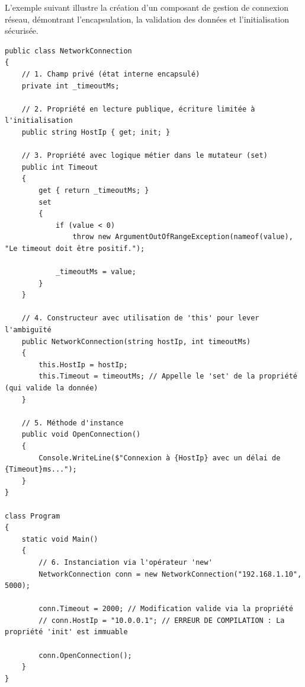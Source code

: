L'exemple suivant illustre la création d'un composant de gestion de connexion réseau, démontrant l'encapsulation, la validation des données et l'initialisation sécurisée.

\begin{lstlisting}[caption={Implémentation d'un composant de connexion réseau}]
public class NetworkConnection
{
    // 1. Champ privé (état interne encapsulé)
    private int _timeoutMs;

    // 2. Propriété en lecture publique, écriture limitée à l'initialisation
    public string HostIp { get; init; }

    // 3. Propriété avec logique métier dans le mutateur (set)
    public int Timeout
    {
        get { return _timeoutMs; }
        set 
        { 
            if (value < 0)
                throw new ArgumentOutOfRangeException(nameof(value), "Le timeout doit être positif.");
            
            _timeoutMs = value;
        }
    }

    // 4. Constructeur avec utilisation de 'this' pour lever l'ambiguïté
    public NetworkConnection(string hostIp, int timeoutMs)
    {
        this.HostIp = hostIp;
        this.Timeout = timeoutMs; // Appelle le 'set' de la propriété (qui valide la donnée)
    }

    // 5. Méthode d'instance
    public void OpenConnection()
    {
        Console.WriteLine($"Connexion à {HostIp} avec un délai de {Timeout}ms...");
    }
}

class Program
{
    static void Main()
    {
        // 6. Instanciation via l'opérateur 'new'
        NetworkConnection conn = new NetworkConnection("192.168.1.10", 5000);
        
        conn.Timeout = 2000; // Modification valide via la propriété
        // conn.HostIp = "10.0.0.1"; // ERREUR DE COMPILATION : La propriété 'init' est immuable
        
        conn.OpenConnection();
    }
}
\end{lstlisting}

